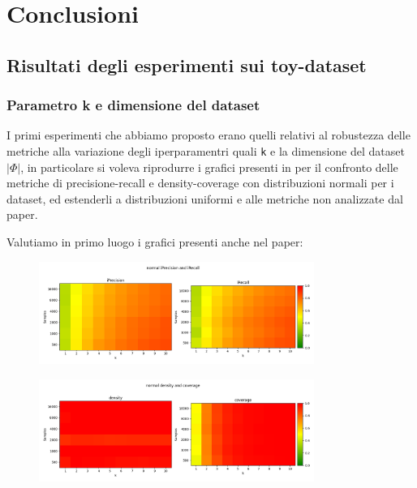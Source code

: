 \chapter{Conclusioni}\label{ch:conclusioni}

\section{Risultati degli esperimenti sui toy-dataset}

\subsection{Parametro k e dimensione del dataset}

I primi esperimenti che abbiamo proposto erano quelli relativi al robustezza delle metriche alla variazione degli iperparamentri quali \texttt{k} e la dimensione del dataset \(|\Phi|\),
in particolare si voleva riprodurre i grafici presenti in \cite{3ReliableFidelityDiversityMetrics} per il confronto delle metriche di precisione-recall e density-coverage con distribuzioni normali per i dataset, ed estenderli a distribuzioni uniformi e alle metriche non analizzate dal paper.

Valutiamo in primo luogo i grafici presenti anche nel paper:

\begin{figure}[!ht]
    \centering
    \includegraphics[width=0.8\textwidth]{../images/toyexperiments/kdim/normal_iPrecision_iRecall.png} 
\end{figure}

\begin{figure}[!ht]
    \centering
    \includegraphics[width=0.8\textwidth]{../images/toyexperiments/kdim/normal_density_coverage.png} 
\end{figure}

